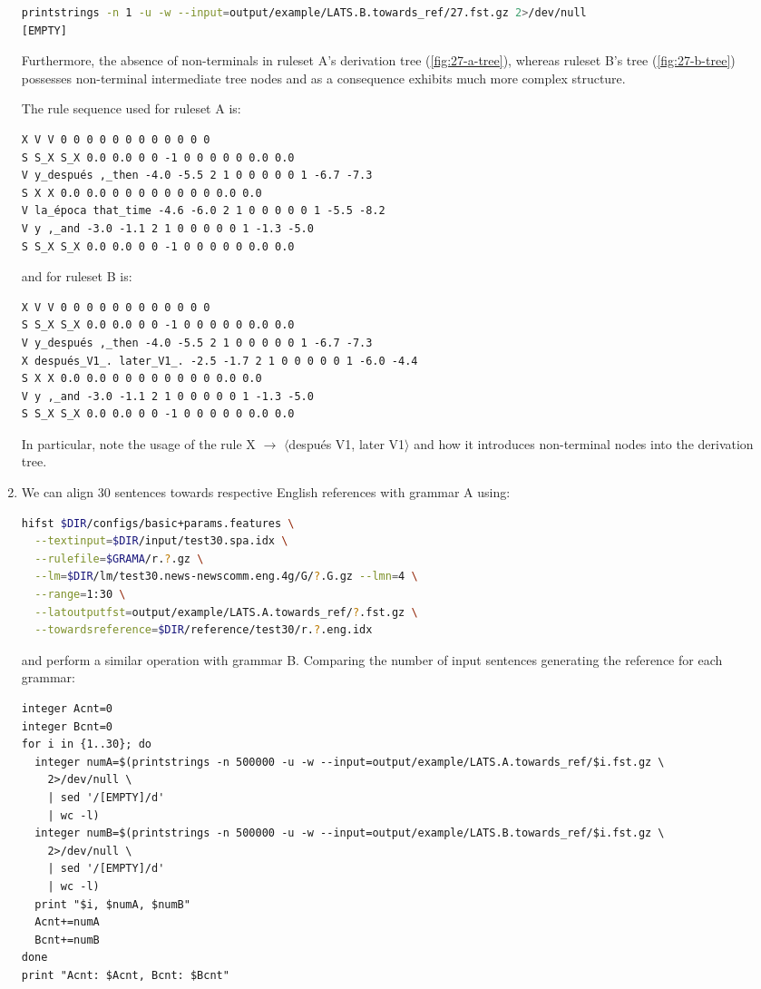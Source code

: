 \documentclass[a4paper,oneside,reqno]{amsart}
\begin{document}
\begin{enumerate}[label=\arabic*.]
\begin{lstlisting}[language=bash]
printstrings -n 1 -u -w --input=output/example/LATS.B.towards_ref/27.fst.gz 2>/dev/null
[EMPTY]
    \end{lstlisting}

    Furthermore, the absence of non-terminals in ruleset A's
    derivation tree (\autoref{fig:27-a-tree}), whereas ruleset B's
    tree (\autoref{fig:27-b-tree}) possesses non-terminal intermediate tree
    nodes and as a consequence exhibits much more complex structure.

    The rule sequence used for ruleset A is:
    \begin{verbatim}
X V V 0 0 0 0 0 0 0 0 0 0 0 0
S S_X S_X 0.0 0.0 0 0 -1 0 0 0 0 0 0.0 0.0
V y_después ,_then -4.0 -5.5 2 1 0 0 0 0 0 1 -6.7 -7.3
S X X 0.0 0.0 0 0 0 0 0 0 0 0 0.0 0.0
V la_época that_time -4.6 -6.0 2 1 0 0 0 0 0 1 -5.5 -8.2
V y ,_and -3.0 -1.1 2 1 0 0 0 0 0 1 -1.3 -5.0
S S_X S_X 0.0 0.0 0 0 -1 0 0 0 0 0 0.0 0.0
    \end{verbatim}
    and for ruleset B is:
    \begin{verbatim}
X V V 0 0 0 0 0 0 0 0 0 0 0 0
S S_X S_X 0.0 0.0 0 0 -1 0 0 0 0 0 0.0 0.0
V y_después ,_then -4.0 -5.5 2 1 0 0 0 0 0 1 -6.7 -7.3
X después_V1_. later_V1_. -2.5 -1.7 2 1 0 0 0 0 0 1 -6.0 -4.4
S X X 0.0 0.0 0 0 0 0 0 0 0 0 0.0 0.0
V y ,_and -3.0 -1.1 2 1 0 0 0 0 0 1 -1.3 -5.0
S S_X S_X 0.0 0.0 0 0 -1 0 0 0 0 0 0.0 0.0
    \end{verbatim}
    In particular, note the usage of the rule X $\to$ $\langle$después V1,
    later V1$\rangle$ and how it introduces non-terminal nodes into
    the derivation tree.

  \item We can align 30 sentences towards respective English references
    with grammar A using:
    \begin{lstlisting}[language=bash]
hifst $DIR/configs/basic+params.features \
  --textinput=$DIR/input/test30.spa.idx \
  --rulefile=$GRAMA/r.?.gz \
  --lm=$DIR/lm/test30.news-newscomm.eng.4g/G/?.G.gz --lmn=4 \
  --range=1:30 \
  --latoutputfst=output/example/LATS.A.towards_ref/?.fst.gz \
  --towardsreference=$DIR/reference/test30/r.?.eng.idx
    \end{lstlisting}
    and perform a similar operation with grammar B.
    Comparing the number of input sentences generating the reference for each
    grammar:

    \begin{lstlisting}
integer Acnt=0
integer Bcnt=0
for i in {1..30}; do
  integer numA=$(printstrings -n 500000 -u -w --input=output/example/LATS.A.towards_ref/$i.fst.gz \
    2>/dev/null \
    | sed '/[EMPTY]/d'
    | wc -l)
  integer numB=$(printstrings -n 500000 -u -w --input=output/example/LATS.B.towards_ref/$i.fst.gz \
    2>/dev/null \
    | sed '/[EMPTY]/d'
    | wc -l)
  print "$i, $numA, $numB"
  Acnt+=numA
  Bcnt+=numB
done
print "Acnt: $Acnt, Bcnt: $Bcnt"
    \end{lstlisting}


\end{enumerate}
\end{document}
